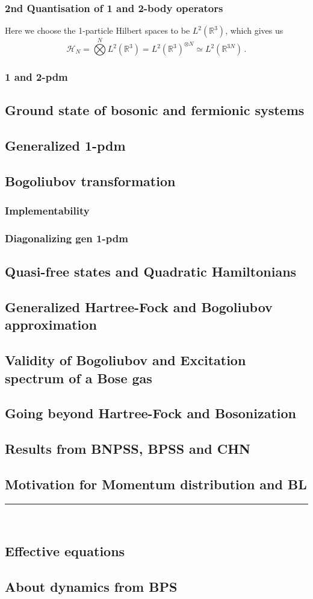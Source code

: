 \documentclass[12pt,a4paper]{article}
\numberwithin{equation}{section}
\newcommand{\1}{\mathbb{I}}
\newcommand{\R}{\mathbb{R}}
\newcommand{\HH}{\mathcal{H}}
\theoremstyle{plain}
\theoremstyle{definition}
\theoremstyle{remark}
\theoremstyle{plain}
\theoremstyle{definition}
\theoremstyle{remark}
\begin{document}
\subsubsection{2nd Quantisation of 1 and 2-body operators}
Here we choose the 1-particle Hilbert spaces to be $L^2(\R^3)$, which gives us
\begin{equation}
	\HH_N = \bigotimes\limits^{N}L^2(\R^3) = L^2(\R^3)^{\otimes N} \simeq L^2(\R^{3N})\,.
\end{equation}

\subsubsection{1 and 2-pdm}
\subsection{Ground state of bosonic and fermionic systems}	
\subsection{Generalized 1-pdm}
\subsection{Bogoliubov transformation}
\subsubsection{Implementability}
\subsubsection{Diagonalizing gen 1-pdm}
\subsection{Quasi-free states and Quadratic Hamiltonians}
\subsection{Generalized Hartree-Fock and Bogoliubov approximation}
\subsection{Validity of Bogoliubov and Excitation spectrum of a Bose gas}
\subsection{Going beyond Hartree-Fock and Bosonization}
\subsection{Results from BNPSS, BPSS and CHN}
\subsection{Motivation for Momentum distribution and BL}
\hrule 
\
\subsection{Effective equations}
\subsection{About dynamics from BPS}
\end{document}
